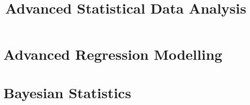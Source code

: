 \documentclass[titlepage=true]{scrartcl}
\title{Advanced Statistical Data Analysis}
\author{}
\begin{document}

\lstset{style=C}
\setcounter{tocdepth}{2}
\setcounter{secnumdepth}{5}
\tableofcontents \newpage

\part{Advanced Regression Modelling}






\clearpage
\part{Bayesian Statistics}






% 
% 
\end{document}
